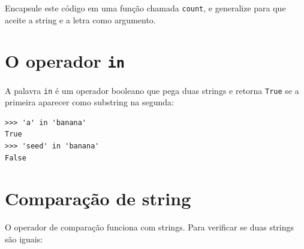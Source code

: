 {\begin{ex}


Encapsule este código em uma função chamada {\tt count}, e generalize para
que aceite a string e a letra como argumento.
\end{ex}

\section{O operador {\tt in}}
\label{inboth}



A palavra {\tt in} é um operador booleano que pega duas strings e retorna
{\tt True} se a primeira aparecer como substring na segunda:

\beforeverb
\begin{verbatim}
>>> 'a' in 'banana'
True
>>> 'seed' in 'banana'
False
\end{verbatim}
\afterverb
%

\section{Comparação de string}



O operador de comparação funciona com strings. Para verificar se duas strings
são iguais:

}
